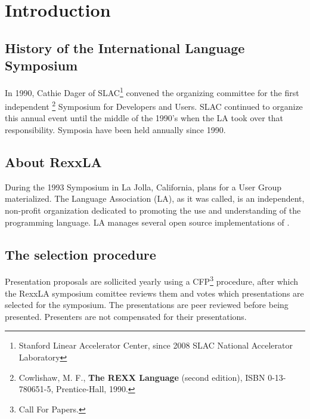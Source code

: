 \def\tightlist{}
\chapter*{Introduction}
\section*{History of the International \rexx{} Language Symposium}
In 1990, Cathie Dager of SLAC\footnote{Stanford Linear Accelerator Center, since 2008 SLAC National Accelerator Laboratory} convened the organizing committee for the first independent \rexx{}\footnote{Cowlishaw, M. F., \textbf{The REXX Language} (second edition), ISBN 0-13-780651-5, Prentice-Hall, 1990.} Symposium for Developers and Users. SLAC continued to organize this annual event until the middle of the 1990's when the \rexx{}LA took over that responsibility. Symposia have been held annually since 1990.
\section*{About RexxLA}
During the 1993 Symposium in La Jolla, California, plans for a \rexx{} User Group materialized. The \rexx{} Language Association (\rexx{}LA), as it was called, is an independent, non-profit organization dedicated to promoting the use and understanding of the \rexx{} programming language. \rexx{}LA manages several open source implementations of \rexx{}.
\section*{The selection procedure}Presentation proposals are sollicited yearly using a CFP\footnote{Call For Papers.} procedure, after which the RexxLA symposium comittee reviews them and votes which presentations are selected for the symposium. The presentations are peer reviewed before being presented. Presenters are not compensated for their presentations.

